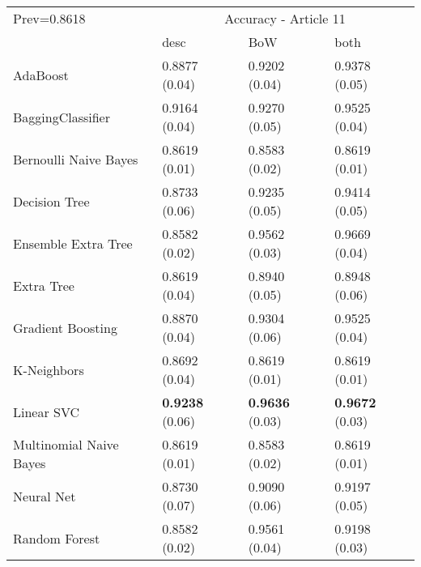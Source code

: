 \begin{tabular}{|l|l|l|l| }
\hline
Prev=0.8618 &  \multicolumn{3}{c|}{Accuracy - Article 11} \\
\cline{2-4} & desc & BoW & both \\ \hline
AdaBoost                & 0.8877 (0.04) & 0.9202 (0.04) & 0.9378 (0.05)\\
BaggingClassifier       & 0.9164 (0.04) & 0.9270 (0.05) & 0.9525 (0.04)\\
Bernoulli Naive Bayes   & 0.8619 (0.01) & 0.8583 (0.02) & 0.8619 (0.01)\\
Decision Tree           & 0.8733 (0.06) & 0.9235 (0.05) & 0.9414 (0.05)\\
Ensemble Extra Tree     & 0.8582 (0.02) & 0.9562 (0.03) & 0.9669 (0.04)\\
Extra Tree              & 0.8619 (0.04) & 0.8940 (0.05) & 0.8948 (0.06)\\
Gradient Boosting       & 0.8870 (0.04) & 0.9304 (0.06) & 0.9525 (0.04)\\
K-Neighbors             & 0.8692 (0.04) & 0.8619 (0.01) & 0.8619 (0.01)\\
Linear SVC              & {\bf 0.9238} (0.06) & {\bf 0.9636} (0.03) & {\bf 0.9672} (0.03)\\
Multinomial Naive Bayes & 0.8619 (0.01) & 0.8583 (0.02) & 0.8619 (0.01)\\
Neural Net              & 0.8730 (0.07) & 0.9090 (0.06) & 0.9197 (0.05)\\
Random Forest           & 0.8582 (0.02) & 0.9561 (0.04) & 0.9198 (0.03)\\
\hline
\end{tabular}